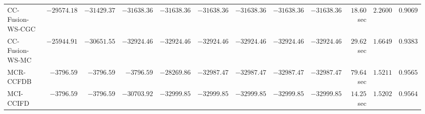 \begin{table}[H]
\begin{tabular}{lrrrrrrrrrrr}
    CC-Fusion-WS-CGC & $    -29574.18$ & $    -31429.37$ & $    -31638.36$ & $    -31638.36$ & $    -31638.36$ & $    -31638.36$ & $    -31638.36$ & $    -31638.36$ & $        18.60$ sec    & $       2.2600$  & $       0.9069$ \\ 
     CC-Fusion-WS-MC & $    -25944.91$ & $    -30651.55$ & $    -32924.46$ & $    -32924.46$ & $    -32924.46$ & $    -32924.46$ & $    -32924.46$ & $    -32924.46$ & $        29.62$ sec    & $       1.6649$  & $       0.9383$ \\ 
\cmidrule{1-1} 
           MCR-CCFDB & $     -3796.59$ & $     -3796.59$ & $     -3796.59$ & $    -28269.86$ & $    -32987.47$ & $    -32987.47$ & $    -32987.47$ & $    -32987.47$ & $        79.64$ sec    & $       1.5211$  & $       0.9565$ \\ 
\cmidrule{1-1} 
           MCI-CCIFD & $     -3796.59$ & $     -3796.59$ & $    -30703.92$ & $    -32999.85$ & $    -32999.85$ & $    -32999.85$ & $    -32999.85$ & $    -32999.85$ & $        14.25$ sec    & $       1.5202$  & $       0.9564$ \\ 
\bottomrule
\end{tabular}
\end{table}

